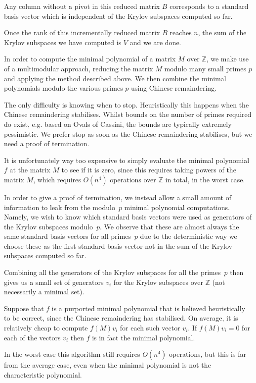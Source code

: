 \documentclass{sig-alternate-05-2015}
\begin{document}
Any column without a pivot in this reduced matrix $B$ corresponds to a
standard basis vector which is independent of the Krylov subspaces
computed so far.

Once the rank of this incrementally reduced matrix $B$ reaches $n$, the sum
of the Krylov subspaces we have computed is $V$ and we are done.

In order to compute the minimal polynomial of a matrix $M$ over $\mathbb{Z}$,
we make use of a multimodular approach, reducing the matrix $M$ modulo many
small primes $p$ and applying the method described above. We then combine
the minimal polynomials modulo the various primes $p$ using Chinese
remaindering.

The only difficulty is knowing when to stop. Heuristically this happens
when the Chinese remaindering stabilises. Whilst bounds on the number of
primes required do exist, e.g. based on Ovals of Cassini, the bounds are
typically extremely pessimistic. We prefer stop as soon as the Chinese
remaindering stabilises, but we need a proof of termination. 

It is unfortunately way too expensive to simply evaluate the minimal
polynomial $f$ at the matrix $M$ to see if it is zero, since this requires
taking powers of the matrix $M$, which requires $O(n^4)$ operations over
$\mathbb{Z}$ in total, in the worst case.

In order to give a proof of termination, we instead allow a small amount of
information to leak from the modulo~$p$ minimal polynomial computations.
Namely, we wish to know which standard basis vectors were used as
generators of the Krylov subspaces modulo~$p$. We observe that these are
almost always the same standard basis vectors for all primes~$p$ due to the
deterministic way we choose these as the first standard basis vector not
in the sum of the Krylov subspaces computed so far. 

Combining all the generators of the Krylov subspaces for all the primes~$p$
then gives us a small set of generators $v_i$ for the Krylov subspaces over
$\mathbb{Z}$ (not necessarily a minimal set).

Suppose that  $f$ is a purported minimal polynomial that is believed
heuristically to be correct, since the Chinese remaindering has stabilised.
On average, it is relatively cheap to compute $f(M)v_i$ for each such
vector $v_i$. If $f(M)v_i = 0$ for each of the vectors $v_i$ then $f$ is
in fact the minimal polynomial.

In the worst case this algorithm still requires $O(n^4)$ operations, but
this is far from the average case, even when the minimal polynomial is not
the characteristic polynomial.
\end{document}
